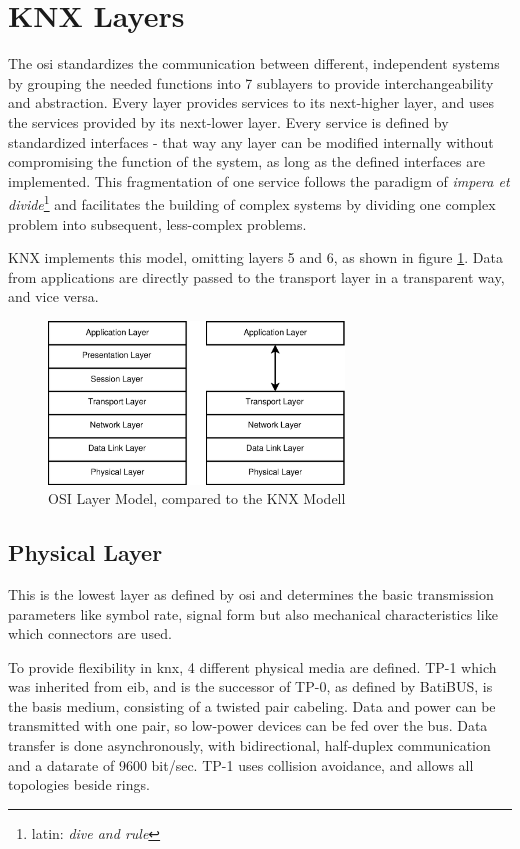 \section{KNX Layers}

The \gls{osi} standardizes the communication between different, independent systems
by grouping the needed functions into 7 sublayers to provide interchangeability and abstraction. Every layer provides services to its next-higher layer, and
uses the services provided by its next-lower layer. Every service is defined by standardized interfaces - that way any layer can be modified internally without
compromising the function of the system, as long as the defined interfaces are implemented. This fragmentation of one service follows the paradigm of 
\textit{impera et divide}\footnote{latin: \textit{dive and rule}} and facilitates the building of complex systems by dividing one complex problem into subsequent,
less-complex problems.

KNX implements this model, omitting 
layers 5 and 6, as shown in figure \ref{fig:knxlayers}. Data from applications are directly passed to the transport layer in a transparent way, and vice versa.

\begin{figure}
    \centering
    \includegraphics[width=0.7\textwidth]{figures/KNXvsISO.eps}
    \caption{OSI Layer Model, compared to the KNX Modell}
    \label{fig:knxlayers}
\end{figure}

\subsection{Physical Layer}

This is the lowest layer as defined by \gls{osi} and determines the basic transmission parameters like symbol rate, signal form but also mechanical 
characteristics like which connectors are used.

To provide flexibility in \gls{knx}, 4 different physical media are defined. \gls{TP}-1 which was inherited from \gls{eib}, and is the successor of \gls{TP}-0,
as defined by BatiBUS, is the basis medium, consisting of a twisted pair cabeling. Data and power can be transmitted with one pair, so low-power
devices can be fed over the bus. Data transfer is done asynchronously, with bidirectional, half-duplex
 communication and a datarate of 9600 bit/sec. \gls{TP}-1 uses collision avoidance, and allows all topologies beside rings. 
 
